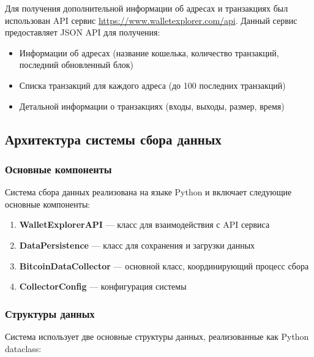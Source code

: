 Для получения дополнительной информации об адресах и транзакциях был использован API сервис \url{https://www.walletexplorer.com/api}. Данный сервис предоставляет JSON API для получения:

\begin{itemize}
    \item Информации об адресах (название кошелька, количество транзакций, последний обновленный блок)
    \item Списка транзакций для каждого адреса (до 100 последних транзакций)
    \item Детальной информации о транзакциях (входы, выходы, размер, время)
\end{itemize}

\subsection{Архитектура системы сбора данных}

\subsubsection{Основные компоненты}

Система сбора данных реализована на языке Python и включает следующие основные компоненты:

\begin{enumerate}
    \item \textbf{WalletExplorerAPI} --- класс для взаимодействия с API сервиса
    \item \textbf{DataPersistence} --- класс для сохранения и загрузки данных
    \item \textbf{BitcoinDataCollector} --- основной класс, координирующий процесс сбора
    \item \textbf{CollectorConfig} --- конфигурация системы
\end{enumerate}

\subsubsection{Структуры данных}

Система использует две основные структуры данных, реализованные как Python dataclass:

